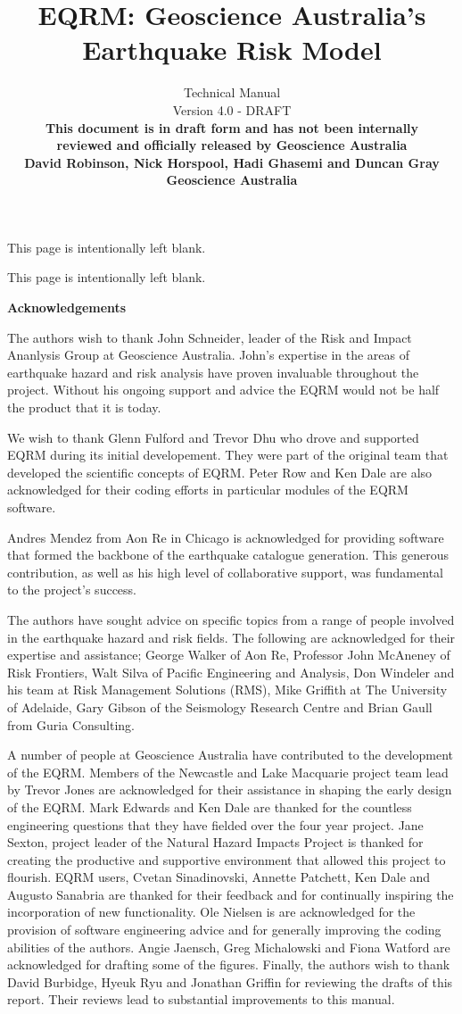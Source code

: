 \documentclass[a4paper, 12pt]{report}
\title{EQRM: Geoscience Australia's Earthquake Risk Model\\
}
\author{Technical Manual \\[1em]
Version 4.0 - DRAFT  \\[3em]
\bf{This document is in draft form and has not been internally}  \\[1em]
\bf{reviewed and officially released by Geoscience Australia} \\[3em]
David Robinson, Nick Horspool, Hadi Ghasemi and Duncan Gray\\[1em]
Geoscience Australia}
\begin{document}
\maketitle


This page is intentionally left blank. \newpage


This page is intentionally left blank.
\newpage

 {\Huge \textbf{Acknowledgements}  }

The authors wish to thank John Schneider, leader of the Risk
and Impact Ananlysis Group at Geoscience Australia. John's expertise in the
areas of earthquake hazard and risk analysis have proven
invaluable throughout the project. Without his ongoing support and
advice the EQRM would not be half the product that it is today.

We wish to thank Glenn Fulford and Trevor Dhu who drove and supported
EQRM during its initial developement.  They were part of the original
team that developed the scientific concepts of EQRM. Peter Row and Ken
Dale are also acknowledged for their coding efforts in particular
modules of the EQRM software.

Andres Mendez from Aon Re in Chicago is acknowledged for providing
software that formed the backbone of the earthquake catalogue
generation. This generous contribution, as well as his high level of
collaborative support, was fundamental to the project's success.

The authors have sought advice on specific topics from a range of
people involved in the earthquake hazard and risk fields. The
following are acknowledged for their expertise and assistance;
George Walker of Aon Re, Professor John McAneney of Risk
Frontiers, Walt Silva of Pacific Engineering and Analysis, Don
Windeler and his team at Risk Management Solutions (RMS), Mike
Griffith at The University of Adelaide, Gary Gibson of the
Seismology Research Centre and Brian Gaull from Guria Consulting.

A number of people at Geoscience Australia have contributed to the
development of the EQRM. Members of the Newcastle and Lake Macquarie
project team lead by Trevor Jones are acknowledged for their
assistance in shaping the early design of the EQRM. Mark Edwards and
Ken Dale are thanked for the countless engineering questions that they
have fielded over the four year project. Jane Sexton, project leader
of the Natural Hazard Impacts Project is thanked for creating the
productive and supportive environment that allowed this project to
flourish. EQRM users, Cvetan Sinadinovski, Annette Patchett, Ken Dale
and Augusto Sanabria are thanked for their feedback and for
continually inspiring the incorporation of new functionality. Ole
Nielsen is are acknowledged for the provision of software engineering
advice and for generally improving the coding abilities of the
authors. Angie Jaensch, Greg Michalowski and Fiona Watford are
acknowledged for drafting some of the figures.  Finally, the authors
wish to thank David Burbidge, Hyeuk Ryu and Jonathan Griffin for reviewing
the drafts of this report. Their reviews lead to substantial
improvements to this manual.
\end{document}
